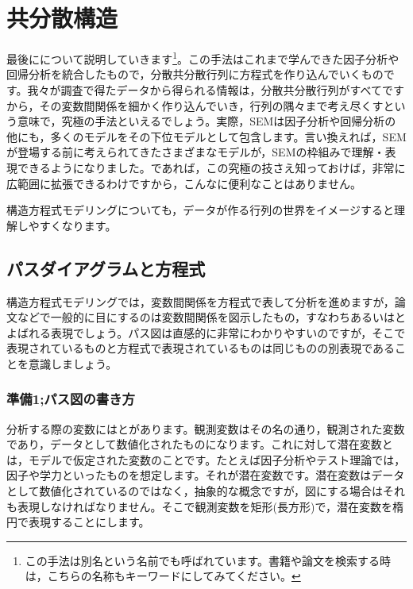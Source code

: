 \documentclass{ltjsbook}
\begin{document}
\chapter{共分散構造}
\label{L09_SEM}

最後にについて説明していきます\footnote{この手法は別名という名前でも呼ばれています。書籍や論文を検索する時は，こちらの名称もキーワードにしてみてください。}。この手法はこれまで学んできた因子分析や回帰分析を統合したもので，分散共分散行列に方程式を作り込んでいくものです。我々が調査で得たデータから得られる情報は，分散共分散行列がすべてですから，その変数間関係を細かく作り込んでいき，行列の隅々まで考え尽くすという意味で，究極の手法といえるでしょう。実際，SEMは因子分析や回帰分析の他にも，多くのモデルをその下位モデルとして包含します。言い換えれば，SEMが登場する前に考えられてきたさまざまなモデルが，SEMの枠組みで理解・表現できるようになりました。であれば，この究極の技さえ知っておけば，非常に広範囲に拡張できるわけですから，こんなに便利なことはありません。

構造方程式モデリングについても，データが作る行列の世界をイメージすると理解しやすくなります。

\section{パスダイアグラムと方程式}
構造方程式モデリングでは，変数間関係を方程式で表して分析を進めますが，論文などで一般的に目にするのは変数間関係を図示したもの，すなわちあるいはとよばれる表現でしょう。パス図は直感的に非常にわかりやすいのですが，そこで表現されているものと方程式で表現されているものは同じものの別表現であることを意識しましょう。

\subsection{準備1;パス図の書き方}
分析する際の変数にはとがあります。観測変数はその名の通り，観測された変数であり，データとして数値化されたものになります。これに対して潜在変数とは，モデルで仮定された変数のことです。たとえば因子分析やテスト理論では，因子や学力といったものを想定します。それが潜在変数です。潜在変数はデータとして数値化されているのではなく，抽象的な概念ですが，図にする場合はそれも表現しなければなりません。そこで観測変数を矩形(長方形)で，潜在変数を楕円で表現することにします。
\end{document}
